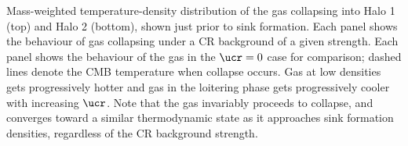\label{fig:temp}
Mass-weighted temperature-density distribution of the gas collapsing into Halo 1 (top) and Halo 2 (bottom), shown just prior to sink formation. Each panel shows the behaviour of gas collapsing under a CR background of a given strength. Each panel shows the behaviour of the gas in the $\ucr=0$ case for comparison; dashed lines denote the CMB temperature when collapse occurs. Gas at low densities gets progressively hotter and gas in the loitering phase gets progressively cooler with increasing $\ucr$. Note that the gas invariably proceeds to collapse, and converges toward a similar thermodynamic state as it approaches sink formation densities, regardless of the CR background strength.